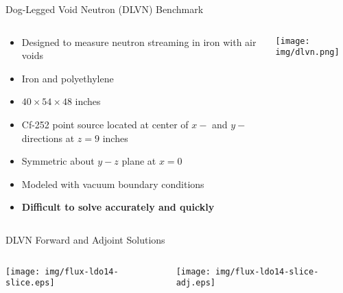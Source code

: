 \documentclass[handout]{beamer} %
\begin{document}
\begin{frame}{Dog-Legged Void Neutron (DLVN) Benchmark}
%
\begin{columns}
\begin{column}{0.5\textwidth}
\begin{itemize}
\item{Designed to measure neutron streaming in iron with air voids}
\item{Iron and polyethylene}
\item{$40\times54\times48$ inches}
\item{Cf-252 point source located at center of $x-$ and $y-$directions at $z = 9$ inches}
\item{Symmetric about $y-z$ plane at $x = 0$}
\item{Modeled with vacuum boundary conditions}
\item{\textbf{Difficult to solve accurately and quickly}}
\end{itemize}
\end{column}
%
\begin{column}{0.5\textwidth}
\texttt{[image: img/dlvn.png]}
\end{column}
\end{columns}

%
\end{frame}

\begin{frame}{DLVN Forward and Adjoint Solutions}
%
\begin{columns}
\begin{column}{0.45\textwidth}
\texttt{[image: img/flux-ldo14-slice.eps]}
\end{column}
%
\begin{column}{0.45\textwidth}
\texttt{[image: img/flux-ldo14-slice-adj.eps]}
\end{column}
\end{columns}
%
\end{frame}
\end{document}

